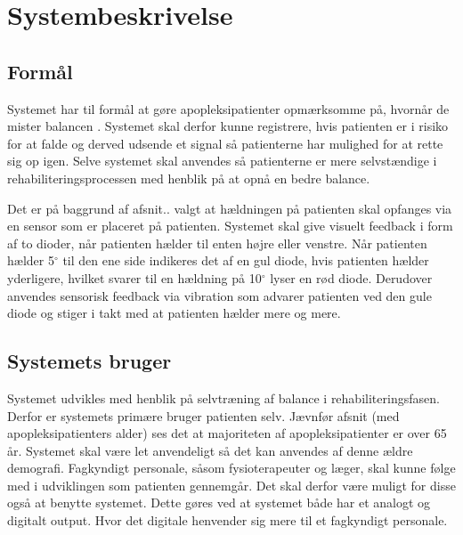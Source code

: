 \section{Systembeskrivelse}  

\subsection{Formål}
Systemet har til formål at gøre apopleksipatienter opmærksomme på, hvornår de mister balancen . Systemet skal derfor kunne registrere, hvis patienten er i risiko for at falde og derved udsende et signal så patienterne har mulighed for at rette sig op igen. Selve systemet skal anvendes så patienterne er mere selvstændige i rehabiliteringsprocessen med henblik på at opnå en bedre balance. 

Det er på baggrund af afsnit.. valgt at hældningen på patienten skal opfanges via en sensor som er placeret på patienten. Systemet skal give visuelt feedback i form af to dioder, når patienten hælder til enten højre eller venstre. Når patienten hælder 5$^{\circ}$ til den ene side indikeres det af en gul diode, hvis patienten hælder yderligere, hvilket svarer til en hældning på 10$^{\circ}$ lyser en rød diode. Derudover anvendes sensorisk feedback via vibration som advarer patienten ved den gule diode og stiger i takt med at patienten hælder mere og mere.  

\subsection{Systemets bruger}
Systemet udvikles med henblik på selvtræning af balance i rehabiliteringsfasen. Derfor er systemets primære bruger patienten selv. Jævnfør afsnit (med apopleksipatienters alder) ses det at majoriteten af apopleksipatienter er over 65 år. Systemet skal være let anvendeligt så det kan anvendes af denne ældre demografi. Fagkyndigt personale, såsom fysioterapeuter og læger, skal kunne følge med i udviklingen som patienten gennemgår. Det skal derfor være muligt for disse også at benytte systemet. Dette gøres ved at systemet både har et analogt og digitalt output. Hvor det digitale henvender sig mere til et fagkyndigt personale.

